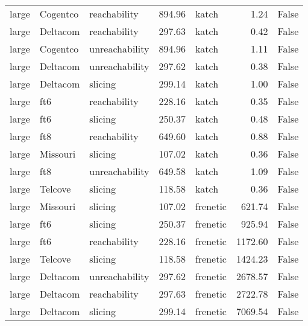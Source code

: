 \begin{tabular}{lllrlrr}
large & Cogentco & reachability & 894.96 & katch & 1.24 & False \\
large & Deltacom & reachability & 297.63 & katch & 0.42 & False \\
large & Cogentco & unreachability & 894.96 & katch & 1.11 & False \\
large & Deltacom & unreachability & 297.62 & katch & 0.38 & False \\
large & Deltacom & slicing & 299.14 & katch & 1.00 & False \\
large & ft6 & reachability & 228.16 & katch & 0.35 & False \\
large & ft6 & slicing & 250.37 & katch & 0.48 & False \\
large & ft8 & reachability & 649.60 & katch & 0.88 & False \\
large & Missouri & slicing & 107.02 & katch & 0.36 & False \\
large & ft8 & unreachability & 649.58 & katch & 1.09 & False \\
large & Telcove & slicing & 118.58 & katch & 0.36 & False \\
large & Missouri & slicing & 107.02 & frenetic & 621.74 & False \\
large & ft6 & slicing & 250.37 & frenetic & 925.94 & False \\
large & ft6 & reachability & 228.16 & frenetic & 1172.60 & False \\
large & Telcove & slicing & 118.58 & frenetic & 1424.23 & False \\
large & Deltacom & unreachability & 297.62 & frenetic & 2678.57 & False \\
large & Deltacom & reachability & 297.63 & frenetic & 2722.78 & False \\
large & Deltacom & slicing & 299.14 & frenetic & 7069.54 & False \\
\bottomrule
\end{tabular}
